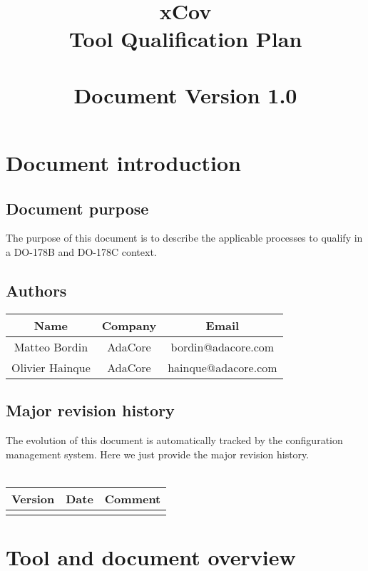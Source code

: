 \documentclass {report}
\begin{document}
\title{\huge xCov\\Tool Qualification Plan\\ \ \\ \large \textbf{Document Version 1.0}}

\maketitle
\tableofcontents

\chapter{Document introduction}

\section{Document purpose}
The purpose of this document is to describe the applicable processes to qualify \xcov in a DO-178B and DO-178C context.

\section{Authors}
\begin{tabular}{|c|c|c|}
\hline
\textbf{Name} & \textbf{Company} & \textbf{Email} \\ \hline
Matteo Bordin & AdaCore & bordin@adacore.com \\ \hline
Olivier Hainque & AdaCore & hainque@adacore.com \\ \hline
\end{tabular}

\section{Major revision history}
The evolution of this document is automatically tracked by the configuration management system. Here we just provide the major revision history.
\ \\ \\
\begin{tabular}{|c|c|c|}
\hline
\textbf{Version} & \textbf{Date} & \textbf{Comment} \\ \hline
 &  &  \\ \hline
\end{tabular}



\chapter{Tool and document overview}
\end{document}
